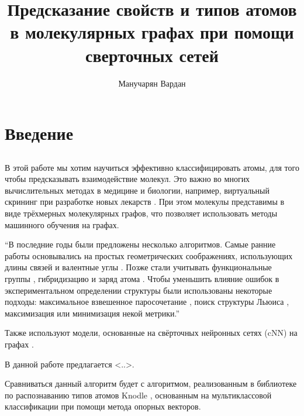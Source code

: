 \documentclass[12pt,twoside]{article}
\title
    [] %
    {Предсказание свойств и типов атомов в молекулярных графах при помощи сверточных сетей}
\author
    [] %
    {Манучарян Вардан} %
    [Манучарян Вардан] %
\begin{document}
\maketitle
\section{Введение}
\subsection{}
	В этой работе мы хотим научиться эффективно классифицировать атомы, для того чтобы предсказывать взаимодействие молекул. Это важно во многих вычислительных методах в медицине и биологии, например, виртуальный скрининг при разработке новых лекарств \cite{article2}. При этом молекулы представимы в виде трёхмерных молекулярных графов, что позволяет использовать методы машинного обучения на графах.
	
	“В последние годы были предложены несколько алгоритмов. Самые ранние работы основывались на простых геометрических соображениях, использующих длины связей и валентные углы \cite{article3}. Позже стали учитывать функциональные группы \cite{article4}, гибридизацию и заряд атома \cite{article5,article6,article7,article8}. Чтобы уменьшить влияние ошибок в экспериментальном определении структуры были использованы некоторые подходы: максимальное взвешенное паросочетание \cite{article9,article10}, поиск структуры Льюиса \cite{article11}, максимизация \cite{article12} или минимизация \cite{article13,article14} некой метрики.”
	
	Также используют модели, основанные на свёрточных нейронных сетях (cNN) на графах \cite{article15,article16}.
	
	В данной работе предлагается <..>.
	
	Сравниваться данный алгоритм будет с алгоритмом, реализованным в библиотеке по распознаванию типов атомов Knodle \cite{article1}, основанным на мультиклассовой классификации при помощи метода опорных векторов.
	
\end{document}
